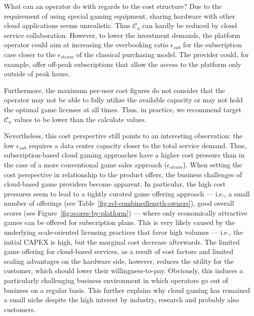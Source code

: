 What can an operator do with regards to the cost structure?
Due to the requirement of using special gaming equipment, sharing hardware with other cloud applications seems unrealistic. Thus $\mathcal{C}_u$ can hardly be reduced by cloud service collaboration. However, to lower the investment demands, the platform operator could aim at increasing the overbooking ratio $\epsilon_{sub}$ for the subscription case closer to the $\epsilon_{steam}$ of the classical purchasing model. The provider could, for example, offer off-peak subscriptions that allow the access to the platform only outside of peak hours. 

Furthermore, the maximum per-user cost figures do not consider that the operator may not be able to fully utilize the available capacity or may not hold the optimal game licenses at all times. Thus, in practice, we recommend target $\mathcal{C}_{u}$ values to be lower than the calculate values.

Nevertheless, this cost perspective still points to an interesting observation: the low $\epsilon_{sub}$ requires a data center capacity closer to the total service demand. Thus, subscription-based cloud gaming approaches have a higher cost pressure than in the case of a more conventional game sales approach ($\epsilon_{steam}$). When setting the cost perspective in relationship to the product offers, the business challenges of cloud-based game providers become apparent. In particular, the high cost pressures seem to lead to a tightly curated game offering approach --- i.e., a small number of offerings (see Table~\ref{fig:rel-combinedlength-owners}), good overall scores (see Figure~\ref{fig:scores-by-platform}) --- where only economically attractive games can be offered for subscription plans. This is very likely caused by the underlying scale-oriented licensing practices that favor high volumes --- i.e., the initial \gls{CAPEX} is high, but the marginal cost decrease afterwards. The limited game offering for cloud-based services, as a result of cost factors and limited scaling advantages on the hardware side, however, reduces the utility for the customer, which should lower their willingness-to-pay. Obviously, this induces a particularly challenging business environment in which operators go out of business on a regular basis. This further explains why cloud gaming has remained a small niche despite the high interest by industry, research and probably also customers.



